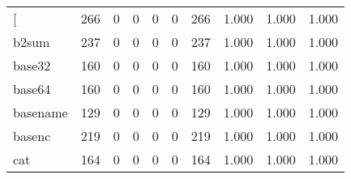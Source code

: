 \begin{longtable}{lp{2.0cm}p{2.0cm}p{2.0cm}p{2.0cm}p{2.0cm}p{2.0cm}p{2.0cm}p{2.0cm}p{2.0cm}}
\bottomrule
\endlastfoot
{[}         &                    266 &                                  0 &                                 0 &                                0 &                                 0 &                             266 &                                   1.000 &                                  1.000 &                                1.000 \\
b2sum     &                    237 &                                  0 &                                 0 &                                0 &                                 0 &                             237 &                                   1.000 &                                  1.000 &                                1.000 \\
base32    &                    160 &                                  0 &                                 0 &                                0 &                                 0 &                             160 &                                   1.000 &                                  1.000 &                                1.000 \\
base64    &                    160 &                                  0 &                                 0 &                                0 &                                 0 &                             160 &                                   1.000 &                                  1.000 &                                1.000 \\
basename  &                    129 &                                  0 &                                 0 &                                0 &                                 0 &                             129 &                                   1.000 &                                  1.000 &                                1.000 \\
basenc    &                    219 &                                  0 &                                 0 &                                0 &                                 0 &                             219 &                                   1.000 &                                  1.000 &                                1.000 \\
cat       &                    164 &                                  0 &                                 0 &                                0 &                                 0 &                             164 &                                   1.000 &                                  1.000 &                                1.000 \\

\end{longtable}
